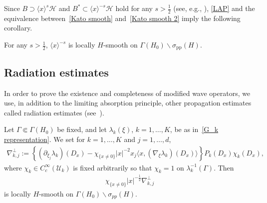 \documentclass[AHL,Unicode,longabstracts,published]{cedram}
\renewcommand{\l}{\lambda}
\newcommand{\x}{\xi}
\newcommand{\s}{\sigma}
\newcommand{\HS}{\mathcal{H}}
\newcommand{\US}{\mathcal{U}}
\newcommand{\pp}{\mathrm{pp}}
\newcommand{\la}{\langle}
\newcommand{\ra}{\rangle}
\newcommand{\jap}[1]{\langle #1 \rangle}
\newcommand{\HS}{\mathcal{H}}
\begin{document}
Since $B \supset \jap{x}^s\HS$ and $B^* \subset \jap{x}^{-s}\HS$ hold for any $s>\frac{1}{2}$ (see, e.g., \cite[Theorem~3.4.1]{A-BdM-G}), \eqref{LAP} and the equivalence between~\eqref{Kato smooth} and~\eqref{Kato smooth 2} imply the following corollary.

\begin{cor}\label{cor_lap}
For any $s>\frac{1}{2}$, $\jap{x}^{-s}$ is locally $H$-smooth on $\Gamma(H_0) \backslash \s_\pp(H)$.
\end{cor}



\subsection{Radiation estimates} In order to prove the existence and completeness of modified wave operators, we use, in addition to the limiting absorption principle, other propagation estimates called radiation estimates (see~\cite[Theorem~10.1.7]{Y}).

\begin{prop}\label{prop_rad_est}
Let $\Gamma\Subset\Gamma(H_0)$ be fixed, and let $\l_k(\x)$, $k=1,\dots,K$, be as in~\eqref{G_k representation}. We set for $k=1,\dots,K$ and $j=1,\dots,d$,
\begin{align*}
\nabla_{k,j}^\perp := \left\{\left(\partial_{\x_j}\l_k\right)(D_x) - \chi_{\{x\neq0\}} |x|^{-2} x_j \la x, (\nabla_\x \l_k)(D_x)\ra \right\} P_k(D_x)\chi_k(D_x),
\end{align*}
where $\chi_k \in C_c^\infty(\US_k)$ is fixed arbitrarily so that $\chi_k=1$ on $\lambda_k^{-1}(\Gamma)$. Then
\begin{align}\label{radiation op}
\chi_{\{x\neq0\}} |x|^{-\frac{1}{2}} \nabla_{k,j}^\perp
\end{align}
is locally $H$-smooth on $\Gamma(H_0)\backslash \s_{pp}(H)$.
\end{prop}
\end{document}
